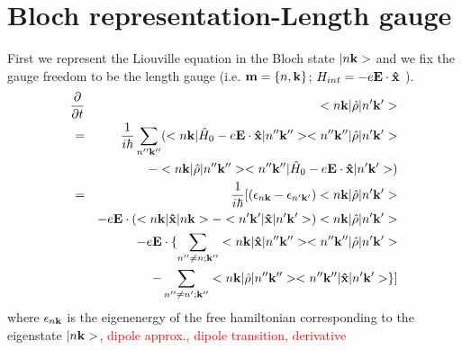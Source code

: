 \documentclass[aps,prb,reprint]{revtex4-1}
\begin{document}
\section{Bloch representation-Length gauge}
First we represent the Liouville equation in the Bloch state $|n{\bf k}>$ and we fix the gauge freedom to be the length gauge (i.e. ${\bf m} = \{n, {\bf k}\}$; $H_{int} =-e{\bf E} \cdot {\bf \hat{x}}$ ). 
\begin{eqnarray*}
\frac{ \partial }{\partial t } &&<n{\bf k}| \hat{\rho} |n'{\bf k'}> \\
= && \frac{1}{i \hbar}  \sum_{n''{\bf k''}} ( <n{\bf k}| \hat{H}_0 -e{\bf E} \cdot {\bf \hat{x}} |n''{\bf k''}><n''{\bf k''}| \hat{\rho} |n'{\bf k'}> \\
&&- <n{\bf k}| \hat{\rho} |n''{\bf k''}><n''{\bf k''}| \hat{H}_0 -e{\bf E} \cdot {\bf \hat{x}}  |n'{\bf k'}> )\\
= &&\frac{1}{i \hbar} [ (\epsilon_{n{\bf k}}-\epsilon_{n'{\bf k'}}) <n{\bf k}| \hat{\rho} |n'{\bf k'}> \\
&& -e{\bf E} \cdot(<n{\bf k}| {\bf \hat{x}} |n{\bf k}> - <n'{\bf k'}| {\bf \hat{x}} |n'{\bf k'}> ) <n{\bf k}| \hat{\rho} |n'{\bf k'}>\\ 
&&-e{\bf E} \cdot \{ \sum_{n'' \neq n; {\bf k''}} <n{\bf k}| {\bf \hat{x}} |n''{\bf k''}> <n''{\bf k''}| \hat{\rho} |n'{\bf k'}> \\
&&- \sum_{n'' \neq n'; {\bf k''}} <n{\bf k}| \hat{\rho} |n''{\bf k''}> <n''{\bf k''}| {\bf \hat{x}} |n'{\bf k'}> \} ]\\
\end{eqnarray*}
where $\epsilon_{n{\bf k}}$ is the eigenenergy of the free hamiltonian corresponding to the eigenstate $|n{\bf k}>$, 
\textcolor{red}{dipole approx., dipole transition, derivative}

\end{document}
